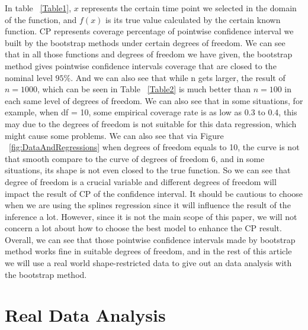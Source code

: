 \documentclass[12pt]{article}
\begin{document}
In table ~\ref{Table1}, \(x\) represents the certain time point we selected in the domain of the function, and \(f(x)\) is its true value calculated by the certain known function. CP represents coverage percentage of pointwise confidence interval we built by the bootstrap methods under certain degrees of freedom. We can see that in all those functions and degrees of freedom we have given, the bootstrap method gives pointwise confidence intervals coverage that are closed to the nominal level \(95\%\). And we can also see that while n gets larger, the result of \(n = 1000\), which can be seen in Table ~\ref{Table2} is much better than \(n = 100\) in each same level of degrees of freedom. We can also see that in some situations, for example, when df = 10, some empirical coverage rate is as low as 0.3 to 0.4, this may due to the degrees of freedom is not suitable for this data regression, which might cause some problems. We can also see that via Figure ~\ref{fig:DataAndRegressions} when degrees of freedom equals to 10, the curve is not that smooth compare to the curve of degrees of freedom 6, and in some situations, its shape is not even closed to the true function. So we can see that degree of freedom is a crucial variable and different degrees of freedom will impact the result of CP of the confidence interval. It should be cautious to choose when we are using the splines regression since it will influence the result of the inference a lot. However, since it is not the main scope of this paper, we will not concern a lot about how to choose the best model to enhance the CP result. Overall, we can see that those pointwise confidence intervals made by bootstrap method works fine in suitable degrees of freedom, and in the rest of this article we will use a real world shape-restricted data to give out an data analysis with the bootstrap method.











\section{Real Data Analysis}
\label{Real Data Analysis}
\end{document}
